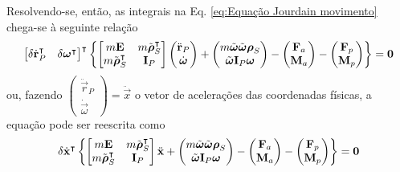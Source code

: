 Resolvendo-se, então, as integrais na Eq. \eqref{eq:Equação Jourdain movimento} chega-se à seguinte relação
\begin{align}
 \begin{bmatrix} \delta\dot{\boldsymbol{\mathrm{r}}}_P^\intercal & \delta\boldsymbol{\mathrm{\omega}}^\intercal \end{bmatrix}^\intercal \left\{\begin{bmatrix}m\boldsymbol{\mathrm{E}} & m\tilde{\boldsymbol{\mathrm{\rho}}}_S^\intercal\\ m\tilde{\boldsymbol{\mathrm{\rho}}}_S^\intercal & \boldsymbol{\mathrm{I}}_P \end{bmatrix}\begin{pmatrix} \ddot{\boldsymbol{\mathrm{r}}}_P \\ \dot{\boldsymbol{\mathrm{\omega}}} \end{pmatrix} + \begin{pmatrix} m\tilde{\boldsymbol{\mathrm{\omega}}}\tilde{\boldsymbol{\mathrm{\omega}}}\boldsymbol{\mathrm{\rho}}_S \\ \tilde{\boldsymbol{\mathrm{\omega}}}\boldsymbol{\mathrm{I}}_P\boldsymbol{\mathrm{\omega}} \end{pmatrix} - \begin{pmatrix} \boldsymbol{\mathrm{F}}_a \\ \boldsymbol{\mathrm{M}}_a\end{pmatrix} - \begin{pmatrix} \boldsymbol{\mathrm{F}}_p \\ \boldsymbol{\mathrm{M}}_p\end{pmatrix}\right\} = \boldsymbol{\mathrm{0}}
\end{align}
ou, fazendo $\begin{pmatrix} \ddot{\vec{r}}_P \\ \dot{\vec{\omega}} \end{pmatrix} = \ddot{\vec{x}}$ o vetor de acelerações das coordenadas físicas, a equação pode ser reescrita como
\begin{align}
 \delta\dot{\boldsymbol{\mathrm{x}}}^\intercal \left\{\begin{bmatrix}m\boldsymbol{\mathrm{E}} & m\tilde{\boldsymbol{\mathrm{\rho}}}_S^\intercal\\ m\tilde{\boldsymbol{\mathrm{\rho}}}_S^\intercal & \boldsymbol{\mathrm{I}}_P \end{bmatrix}\ddot{\boldsymbol{\mathrm{x}}} + \begin{pmatrix} m\tilde{\boldsymbol{\mathrm{\omega}}}\tilde{\boldsymbol{\mathrm{\omega}}}\boldsymbol{\mathrm{\rho}}_S \\ \tilde{\boldsymbol{\mathrm{\omega}}}\boldsymbol{\mathrm{I}}_P\boldsymbol{\mathrm{\omega}} \end{pmatrix} - \begin{pmatrix} \boldsymbol{\mathrm{F}}_a \\ \boldsymbol{\mathrm{M}}_a\end{pmatrix} - \begin{pmatrix} \boldsymbol{\mathrm{F}}_p \\ \boldsymbol{\mathrm{M}}_p\end{pmatrix}\right\} = \boldsymbol{\mathrm{0}} \label{eq:Eq mov Jourdain final}
\end{align}

